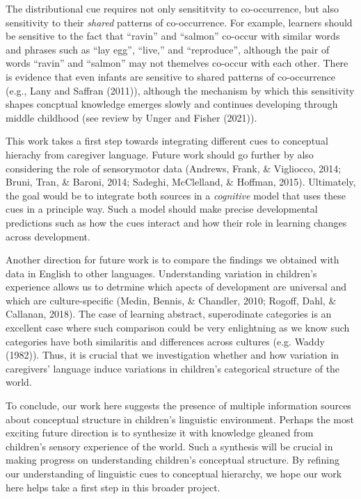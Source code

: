 \documentclass[english,,man,floatsintext]{apa6}
\begin{document}
The distributional cue requires not only sensititvity to co-occurrence, but also sensitivity to their \emph{shared} patterns of co-occurrence. For example, learners should be sensitive to the fact that \enquote{ravin} and \enquote{salmon} co-occur with similar words and phrases such as \enquote{lay egg}, \enquote{live,} and \enquote{reproduce}, although the pair of words \enquote{ravin} and \enquote{salmon} may not themelves co-occur with each other. There is evidence that even infants are sensitive to shared patterns of co-occurrence (e.g., Lany and Saffran (2011)), although the mechanism by which this sensitivity shapes concptual knowledge emerges slowly and continues developing through middle childhood (see review by Unger and Fisher (2021)).

This work takes a first step towards integrating different cues to conceptual hierachy from caregiver language. Future work should go further by also considering the role of sensorymotor data (Andrews, Frank, \& Vigliocco, 2014; Bruni, Tran, \& Baroni, 2014; Sadeghi, McClelland, \& Hoffman, 2015). Ultimately, the goal would be to integrate both sources in a \emph{cognitive} model that uses these cues in a principle way. Such a model should make precise developmental predictions such as how the cues interact and how their role in learning changes across development.

Another direction for future work is to compare the findings we obtained with data in English to other languages. Understanding variation in children's experience allows us to detrmine which apects of development are universal and which are culture-specific (Medin, Bennis, \& Chandler, 2010; Rogoff, Dahl, \& Callanan, 2018). The case of learning abstract, superodinate categories is an excellent case where such comparison could be very enlightning as we know such categories have both similaritis and differences across cultures (e.g. Waddy (1982)). Thus, it is crucial that we investigation whether and how variation in caregivers' language induce variations in children's categorical structure of the world.

To conclude, our work here suggests the presence of multiple information sources about conceptual structure in children's linguistic environment. Perhaps the most exciting future direction is to synthesize it with knowledge gleaned from children's sensory experience of the world. Such a synthesis will be crucial in making progress on understanding children's conceptual structure. By refining our understanding of linguistic cues to conceptual hierarchy, we hope our work here helps take a first step in this broader project.
\end{document}
